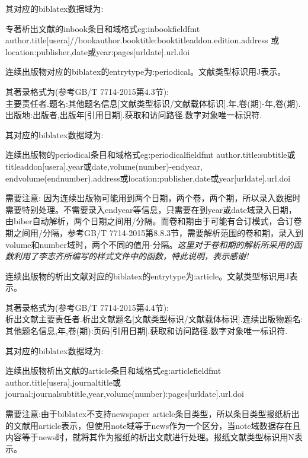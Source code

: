 \documentclass[11pt]{article} %
\begin{document}
其对应的biblatex数据域为:
\begin{codetex}{专著析出文献的inbook条目和域格式}{eg:inbookfieldfmt}
author.title[usera]//bookauthor.booktitle:booktitleaddon.edition.address 或location:publisher,date或year:pages[urldate].url.doi
\end{codetex}

\begin{refentry}{}{}
连续出版物对应的biblatex的entrytype为:periodical。文献类型标识用J表示。

其著录格式为(参考GB/T 7714-2015第4.3节):\\
主要责任者.题名:其他题名信息[文献类型标识/文献载体标识].年,卷(期)-年,卷(期).出版地:出版者,出版年[引用日期].获取和访问路径.数字对象唯一标识符.
\end{refentry}

其对应的biblatex数据域为:
\begin{codetex}{连续出版物的periodical条目和域格式}{eg:periodicalfieldfmt}
author.title:subtitle或titleaddon[usera].year或date,volume(number)-endyear, endvolume(endnumber).address或location:publisher,date或year[urldate].url.doi
\end{codetex}

需要注意: 因为连续出版物可能用到两个日期，两个卷，两个期，所以录入数据时需要特别处理。不需要录入endyear等信息，只需要在到year或date域录入日期，由biber自动解析，两个日期之间用/分隔。而卷和期由于可能有合订模式，合订卷期之间用/分隔，参考GB/T 7714-2015第8.8.3节，需要解析范围的卷和期，录入到volume和number域时，两个不同的值用-分隔。\emph{这里对于卷和期的解析所采用的函数利用了李志齐所编写的样式文件中的函数，特此说明，表示感谢!}

\begin{refentry}{}{}
连续出版物的析出文献对应的biblatex的entrytype为:article。文献类型标识用J表示。

其著录格式为(参考GB/T 7714-2015第4.4节):\\
析出文献主要责任者.析出文献题名[文献类型标识/文献载体标识].连续出版物题名:其他题名信息,年,卷(期):页码[引用日期].获取和访问路径.数字对象唯一标识符.
\end{refentry}

其对应的biblatex数据域为:
\begin{codetex}{连续出版物析出文献的article条目和域格式}{eg:articlefieldfmt}
author.title[usera].journaltitle或journal:journalsubtitle,year,volume(number):pages[urldate].url.doi
\end{codetex}

需要注意:由于biblatex不支持newspaper article条目类型，所以条目类型报纸析出的文献用article表示，但使用note域等于news作为一个区分，当note域数据存在且内容等于news时，就将其作为报纸的析出文献进行处理。报纸文献类型标识用N表示。
\end{document}
